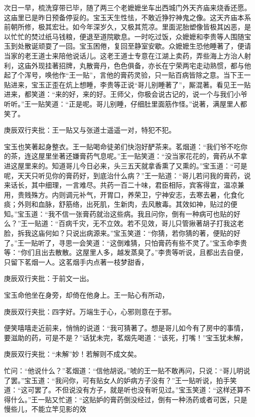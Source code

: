 \begin{parag}
    次日一早，梳洗穿带已毕，随了两三个老嬷嬷坐车出西城门外天齐庙来烧香还愿。这庙里已是昨日预备停妥的。宝玉天生性怯，不敢近狰狞神鬼之像。这天齐庙本系前朝所修，极其宏壮。如今年深岁久，又极其荒凉。里面泥胎塑像皆极其凶恶，是以忙忙的焚过纸马钱粮，便退至道院歇息。一时吃过饭，众嬷嬷和李贵等人围随宝玉到处散诞顽耍了一回。宝玉困倦，复回至静室安歇。众嬷嬷生恐他睡著了，便请当家的老王道士来陪他说话儿。这老王道士专意在江湖上卖药，弄些海上方治人射利，这庙外现挂著招牌，丸散膏丹，色色俱备，亦长在宁荣两宅走动熟惯，都与他起了个浑号，唤他作“王一贴”，言他的膏药灵验，只一贴百病皆除之意。当下王一贴进来，宝玉正歪在炕上想睡，李贵等正说“哥儿别睡著了”，厮混著。看见王一贴进来，都笑道：“来的好，来的好。王师父，你极会说古记的，说一个与我们小爷听听。”王一贴笑道：“正是呢。哥儿别睡，仔细肚里面筋作怪。”说著，满屋里人都笑了。\begin{note}庚辰双行夹批：王一贴又与张道士遥遥一对，特犯不犯。\end{note}宝玉也笑著起身整衣。王一贴喝命徒弟们快泡好酽茶来。茗烟道：“我们爷不吃你的茶，连这屋里坐著还嫌膏药气息呢。”王一贴笑道：“没当家花花的，膏药从不拿进这屋里来的。知道哥儿今日必来，头三五天就拿香熏了又熏的。”宝玉道：“可是呢，天天只听见你的膏药好，到底治什么病？”王一贴道：“哥儿若问我的膏药，说来话长，其中细理，一言难尽。共药一百二十味，君臣相际，宾客得宜，温凉兼用，贵贱殊方。内则调元补气，开胃口，养荣卫，宁神安志，去寒去暑，化食化痰；外则和血脉，舒筋络，出死肌，生新肉，去风散毒。其效如神，贴过的便知。”宝玉道：“我不信一张膏药就治这些病。我且问你，倒有一种病可也贴的好么？”王一贴道：“百病千灾，无不立效。若不见效，哥儿只管揪著胡子打我这老脸，拆我这庙何如？只说出病源来。”宝玉笑道：“你猜，若你猜的著，便贴的好了。”王一贴听了，寻思一会笑道：“这倒难猜，只怕膏药有些不灵了。”宝玉命李贵等：“你们且出去散散。这屋里人多，越发蒸臭了。”李贵等听说，且都出去自便，只留下茗烟一人。这茗烟手内点著一枝梦甜香，\begin{note}庚辰双行夹批：于前文一出。\end{note}宝玉命他坐在身旁，却倚在他身上。王一贴心有所动，\begin{note}庚辰双行夹批：四字好。万端生于心，心邪则意在于邪。\end{note}便笑嘻嘻走近前来，悄悄的说道：“我可猜著了。想是哥儿如今有了房中的事情，要滋助的药，可是不是？”话犹未完，茗烟先喝道：“该死，打嘴！”宝玉犹未解，\begin{note}庚辰双行夹批：“未解”妙！若解则不成文矣。\end{note}忙问：“他说什么？”茗烟道：“信他胡说。”唬的王一贴不敢再问，只说：“哥儿明说了罢。”宝玉道：“我问你，可有贴女人的妒病方子没有？”王一贴听说，拍手笑道：“这可罢了。不但说没有方子，就是听也没有听见过。”宝玉笑道：“这样还算不得什么。”王一贴又忙道：“这贴妒的膏药倒没经过，倒有一种汤药或者可医，只是慢些儿，不能立竿见影的效
\end{parag}
